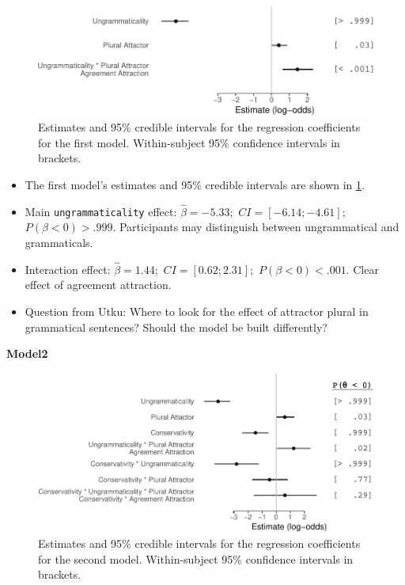 \documentclass[
  10pt,
  english,
  doc,floatsintext]{apa6}
\providecommand{\tightlist}{%
  \setlength{\itemsep}{0pt}\setlength{\parskip}{0pt}}
\begin{document}
\begin{figure}
\centering
\includegraphics{paperdraft_files/figure-latex/Model1-1.pdf}
\caption{\label{fig:Model1}Estimates and 95\% credible intervals for the regression coefficients for the first model. Within-subject 95\% confidence intervals in brackets.}
\end{figure}

\begin{itemize}
\tightlist
\item
  The first model's estimates and 95\% credible intervals are shown in \ref{fig:Model1}.
\item
  Main \texttt{ungrammaticality} effect: \(\hat{\beta}=-5.33;\) \(CI=[-6.14; -4.61];\) \(P(\beta<0)> .999\). Participants may distinguish between ungrammatical and grammaticals.
\item
  Interaction effect: \(\hat{\beta}=1.44;\) \(CI=[0.62; 2.31];\) \(P(\beta<0)< .001\). Clear effect of agreement attraction.
\item
  Question from Utku: Where to look for the effect of attractor plural in grammatical sentences? Should the model be built differently?
\end{itemize}

\textbf{Model2}

\begin{figure}
\centering
\includegraphics{paperdraft_files/figure-latex/Model1Grouped-1.pdf}
\caption{\label{fig:Model1Grouped}Estimates and 95\% credible intervals for the regression coefficients for the second model. Within-subject 95\% confidence intervals in brackets.}
\end{figure}
\end{document}

